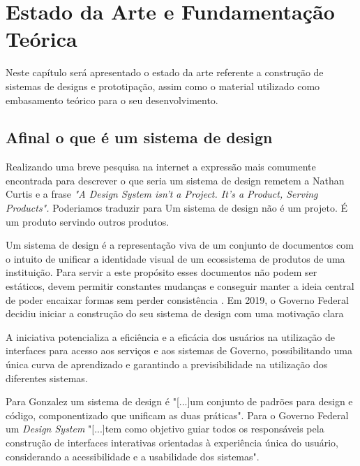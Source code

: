 \chapter[Capítulo 2]{Estado da Arte e Fundamentação Teórica}
\label{ch:cap2}

  Neste capítulo será apresentado o estado da arte referente a construção de sistemas de designs e prototipação, assim como o material utilizado como embasamento teórico para o seu desenvolvimento.

\section{Afinal o que é um sistema de design}
  Realizando uma breve pesquisa na internet a expressão mais comumente encontrada para descrever o que seria um sistema de design remetem a Nathan Curtis e a frase \textit{"A Design System isn’t a Project. It’s a Product, Serving Products".} \cite{descricao_sistema_design} Poderiamos traduzir para Um sistema de design não é um projeto. É um produto servindo outros produtos.

  Um sistema de design é a representação viva de um conjunto de documentos com o intuito de unificar a identidade visual de um ecossistema de produtos de uma instituição. Para servir a este propósito esses documentos não podem ser estáticos, devem permitir constantes mudanças e conseguir manter a ideia central de poder encaixar formas sem perder consistência \cite{design_gov_digital}.
  Em 2019, o Governo Federal decidiu iniciar a construção do seu sistema  de design com uma motivação clara

\begin{citacao}[brazil]
  [...]A iniciativa potencializa a eficiência e a eficácia dos usuários na utilização de interfaces para acesso aos serviços e aos sistemas de Governo, possibilitando uma única curva de aprendizado e garantindo a previsibilidade na utilização dos diferentes sistemas. \cite{design_gov_federal}
\end{citacao}

  Para Gonzalez um sistema de design é "[...]um conjunto de padrões para design e código, componentizado que unificam as duas práticas". \cite{GuilhermeGonzalez} Para o Governo Federal um \textit{Design System} "[...]tem como objetivo guiar todos os responsáveis pela construção de interfaces interativas orientadas à experiência única do usuário, considerando a acessibilidade e a usabilidade dos sistemas". \cite{design_gov_federal}

